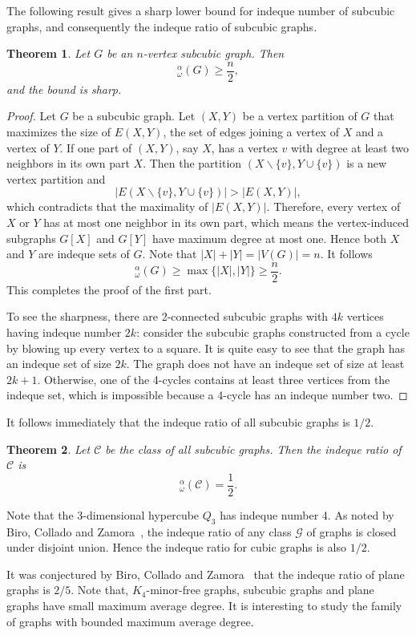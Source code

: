 \documentclass{article}
\newtheorem{thm}{Theorem}[section]
\newcommand{\idq}{{}^{\alpha}_{\omega}}
\begin{document}
The following result gives a sharp lower bound for indeque number of subcubic graphs, and consequently  the indeque ratio of  subcubic graphs.

\begin{thm}
Let $G$ be an $n$-vertex subcubic graph. Then 
\[\idq(G)\ge \frac n 2,\]
and the bound is sharp. 
\end{thm}
\begin{proof}
    Let $G$ be a subcubic graph. Let $(X,Y)$ be a vertex partition of $G$ that maximizes the size of $E(X,Y)$, the set of edges joining a vertex of $X$ and a vertex of $Y$. If one part of $(X,Y)$, say $X$, has a vertex $v$ with degree at least two neighbors in its own part $X$. Then the partition $(X\backslash \{v\}, Y\cup \{v\})$ is a new vertex partition and 
    \[|E(X\backslash \{v\}, Y\cup \{v\})|>|E(X,Y)|,\] which contradicts that the maximality of $|E(X,Y)|$. Therefore, every vertex of $X$ or $Y$ has at most one neighbor in its own part, which means the vertex-induced subgraphs $G[X]$ and $G[Y]$ have maximum degree at most one. 
    Hence both $X$ and $Y$ are indeque sets of $G$. Note that $|X|+|Y|=|V(G)|=n$. It follows 
    \[\idq(G)\ge \max\{|X|, |Y|\}\ge \frac n 2.\]
    This completes the proof of the first part.
    
    To see the sharpness, there are 2-connected subcubic graphs with $4k$ vertices having indeque number $2k$: consider the subcubic graphs constructed from a cycle by blowing up every vertex to a square. It is quite easy to see that the graph has an indeque set of size $2k$. The graph does not have an indeque set of size at least $2k+1$. Otherwise, one of the 4-cycles contains at least three vertices from the indeque set, which is impossible because a 4-cycle has an indeque number two. 
\end{proof}

It follows immediately that the indeque ratio of all subcubic graphs is $1/2$. 

\begin{thm}
Let $\mathcal C$ be the class of all subcubic graphs. Then the indeque ratio of $\mathcal C$ is 
\[\idq(\mathcal C)=\frac 1 2.\]
\end{thm}

Note that the 3-dimensional hypercube $Q_3$ has indeque number 4. As noted by Biro, Collado and Zamora~\cite{BCZ}, the indeque ratio of any class $\mathcal G$ of graphs is closed under disjoint union.  Hence the indeque ratio for cubic graphs is also $1/2$.  

It was conjectured by Biro, Collado and Zamora~\cite{BCZ} that the indeque ratio of plane graphs is $2/5$. Note that, $K_4$-minor-free graphs, subcubic graphs and plane graphs have small maximum average degree. It is interesting to study the family of graphs with bounded maximum average degree. 
\end{document}
